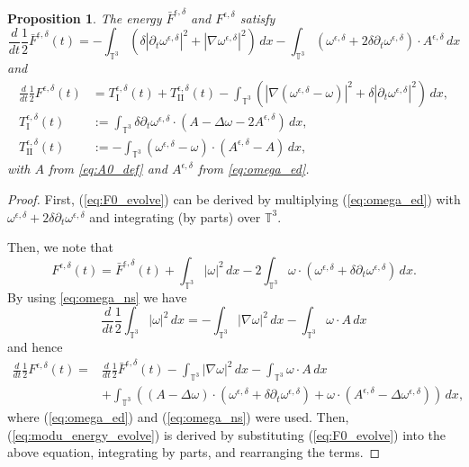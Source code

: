\documentclass[reqno,10pt]{amsart}
\newtheorem{proposition}[theorem]{Proposition}
\theoremstyle{definition}
\theoremstyle{remark}
\numberwithin{equation}{section}
\begin{document}
\begin{proposition}
The energy $\bar F^{\epsilon,\delta}$ and $F^{\epsilon,\delta}$ satisfy
\begin{equation} \label{eq:F0_evolve}
    \frac{d}{dt}\frac{1}{2}\bar F^{\epsilon,\delta}(t) = -\int_{\mathbb T^3} \left( \delta \left|\partial_t \omega^{\epsilon,\delta} \right|^2 + \left| \nabla\omega^{\epsilon,\delta} \right|^2 \right) \, dx -\int_{\mathbb T^3} \left( \omega^{\epsilon,\delta}+2\delta\partial_t \omega^{\epsilon,\delta} \right)\cdot A^{\epsilon,\delta} \, dx
\end{equation}
and
\begin{equation} \label{eq:modu_energy_evolve}
\begin{split}
    \frac{d}{dt}\frac{1}{2}F^{\epsilon,\delta}(t) &= T^{\epsilon,\delta}_\text{I}(t) + T^{\epsilon,\delta}_\text{II}(t) - \int_{\mathbb T^3}\left( \left| \nabla(\omega^{\epsilon,\delta}-\omega) \right|^2 + \delta \left| \partial_t\omega^{\epsilon,\delta} \right|^2 \right)\,dx, \\
    T^{\epsilon,\delta}_\text{I}(t) &:= \int_{\mathbb T^3} \delta\partial_t\omega^{\epsilon,\delta} \cdot\left(A-\Delta\omega-2A^{\epsilon,\delta} \right) \, dx, \\
    T^{\epsilon,\delta}_\text{II}(t) &:= - \int_{\mathbb T^3} (\omega^{\epsilon,\delta}-\omega)\cdot(A^{\epsilon,\delta}-A)\,dx,
\end{split}
\end{equation}
with  $A$ from \eqref{eq:A0_def} and $A^{\epsilon,\delta}$ from \eqref{eq:omega_ed}.
\end{proposition}

\begin{proof}
First, (\ref{eq:F0_evolve}) can be derived by multiplying (\ref{eq:omega_ed}) with $\omega^{\epsilon,\delta} + 2\delta \partial_t \omega^{\epsilon,\delta}$ and integrating (by parts) over $\mathbb T^3$.

Then, we note that
\[
    F^{\epsilon,\delta}(t) = \bar F^{\epsilon,\delta}(t) + \int_{\mathbb T^3} |\omega|^2\,dx - 2\int_{\mathbb T^3} \omega \cdot \left( \omega^{\epsilon,\delta} +\delta\partial_t \omega^{\epsilon,\delta} \right) \,dx.
\]
By using \eqref{eq:omega_ns} we have
\[
    \frac{d}{dt}\frac{1}{2}\int_{\mathbb T^3}|\omega|^2\,dx = -\int_{\mathbb T^3}|\nabla \omega|^2\,dx - \int_{\mathbb T^3}\omega\cdot A\, dx
\]
and hence
\[
\begin{aligned}
    \frac{d}{dt}\frac{1}{2}F^{\epsilon,\delta}(t) =& \frac{d}{dt}\frac{1}{2}\bar F^{\epsilon,\delta}(t) - \int_{\mathbb T^3}|\nabla \omega|^2\,dx - \int_{\mathbb T^3}\omega\cdot A\, dx \\
    &+ \int_{\mathbb T^3} \left( (A-\Delta\omega) \cdot \left(\omega^{\epsilon,\delta} + \delta \partial_t \omega^{\epsilon,\delta}\right) + \omega \cdot (A^{\epsilon,\delta}-\Delta \omega^{\epsilon,\delta}) \right) \,dx,
\end{aligned}
\]
where (\ref{eq:omega_ed}) and (\ref{eq:omega_ns}) were used. Then, (\ref{eq:modu_energy_evolve}) is derived by substituting (\ref{eq:F0_evolve}) into the above equation, integrating by parts, and rearranging the terms.
\end{proof}
\end{document}
